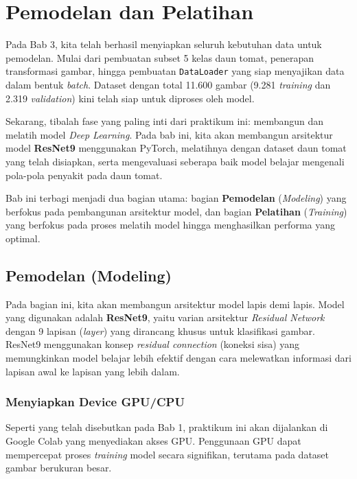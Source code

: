 \chapter{Pemodelan dan Pelatihan}

Pada Bab 3, kita telah berhasil menyiapkan seluruh kebutuhan data untuk pemodelan. Mulai dari pembuatan subset 5 kelas daun tomat, penerapan transformasi gambar, hingga pembuatan \texttt{DataLoader} yang siap menyajikan data dalam bentuk \textit{batch}. Dataset dengan total 11.600 gambar (9.281 \textit{training} dan 2.319 \textit{validation}) kini telah siap untuk diproses oleh model.

Sekarang, tibalah fase yang paling inti dari praktikum ini: membangun dan melatih model \textit{Deep Learning}. Pada bab ini, kita akan membangun arsitektur model \textbf{ResNet9} menggunakan PyTorch, melatihnya dengan dataset daun tomat yang telah disiapkan, serta mengevaluasi seberapa baik model belajar mengenali pola-pola penyakit pada daun tomat.

Bab ini terbagi menjadi dua bagian utama: bagian \textbf{Pemodelan} (\textit{Modeling}) yang berfokus pada pembangunan arsitektur model, dan bagian \textbf{Pelatihan} (\textit{Training}) yang berfokus pada proses melatih model hingga menghasilkan performa yang optimal.

\section{Pemodelan (Modeling)}

Pada bagian ini, kita akan membangun arsitektur model lapis demi lapis. Model yang digunakan adalah \textbf{ResNet9}, yaitu varian arsitektur \textit{Residual Network} dengan 9 lapisan (\textit{layer}) yang dirancang khusus untuk klasifikasi gambar. ResNet9 menggunakan konsep \textit{residual connection} (koneksi sisa) yang memungkinkan model belajar lebih efektif dengan cara melewatkan informasi dari lapisan awal ke lapisan yang lebih dalam.

\subsection{Menyiapkan Device GPU/CPU}

Seperti yang telah disebutkan pada Bab 1, praktikum ini akan dijalankan di Google Colab yang menyediakan akses GPU. Penggunaan GPU dapat mempercepat proses \textit{training} model secara signifikan, terutama pada dataset gambar berukuran besar.

